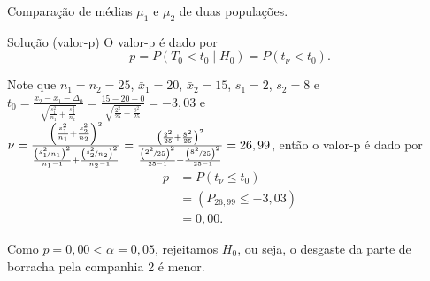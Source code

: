 \documentclass[9pt]{beamer}
\begin{document}
\begin{frame}{Comparação de médias $\mu_1$ e $\mu_2$ de duas populações.}

\begin{block}{Solução (valor-p)}
	O valor-p é dado por
	$$p = P (T_0 < t_0 \mid H_0) = P(t_\nu < t_0).$$
	
	Note que $n_1=n_2=25$, $\bar{x}_1=20$, $\bar{x}_2=15$, $s_1=2$, $s_2=8$ e $t_0 = \frac{\bar{x}_2 - \bar{x}_1- \Delta_0}{\sqrt{\frac{s_1^2}{n_1} + \frac{s_2^2}{n_2}}} = \frac{15 - 20  - 0}{\sqrt{\frac{2^2}{25} + \frac{8^2}{25}}}=-3,03$ e $\nu = \frac{\left( \frac{s_1^2}{n_1} + \frac{s_2^2}{n_2} \right)^2}{\frac{\left(\nicefrac{s_1^2}{n_1}\right)^2}{n_1-1} + \frac{\left(\nicefrac{s_2^2}{n_2}\right)^2}{n_2-1}} = \frac{\left( \frac{2^2}{25} + \frac{8^2}{25} \right)^2}{\frac{\left(\nicefrac{2^2}{25}\right)^2}{25-1} + \frac{\left(\nicefrac{8^2}{25}\right)^2}{25-1}} = 26,99$, então o valor-p é dado por
	\begin{align*}
		p &= P(t_\nu \leq t_0)\\
		&= (P_{26,99} \leq -3,03)\\
		&= 0,00.
	\end{align*}
	
	Como $p=0,00 < \alpha=0,05$, rejeitamos $H_0$, ou seja, o desgaste da parte de borracha pela companhia 2 é menor.
\end{block}

\end{frame}
\end{document}
